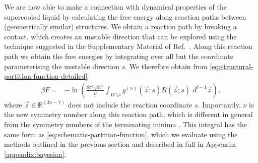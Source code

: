 \documentclass[11pt,twoside]{report}
\begin{document}
We are now able to make a connection with dynamical properties of the supercooled liquid by calculating the free energy along reaction paths between (geometrically similar) structures.
We obtain a reaction path by breaking a contact, which creates an unstable direction that can be explored using the technique suggested in the Supplementary Material of Ref.\ \cite{Holmes-CerfonSR2016}.
Along this reaction path we obtain the free energies by integrating over all but the coordinate parameterising the unstable direction $s$.
We therefore obtain from \eqref{eq:structural-partition-function-detailed}
\begin{equation}\label{eq:reaction-path-free-energy}
  \begin{split}
    \beta F
    =&
    - \ln \left(
    \frac{8\pi^2 \sqrt{n^3}}{\nu} \int_{D' \setminus s}
    g^{(n)}(\vec{z}; s) R(\vec{z}; s) \,
    \, d^{l-1} \vec{z}
    \right),
  \end{split}
\end{equation}
where $\vec{z} \in \mathbb{R}^{(3n-7)}$ does not include the reaction coordinate $s$.
Importantly, $\nu$ is the new symmetry number along this reaction path, which is different in general from the symmetry numbers of the terminating minima \cite{Wales2004}.
This integral has the same form as \eqref{eq:schematic-partition-function}, which we evaluate using the methods outlined in the previous section and described in full in Appendix \ref{appendix:bayesian}.
\end{document}

